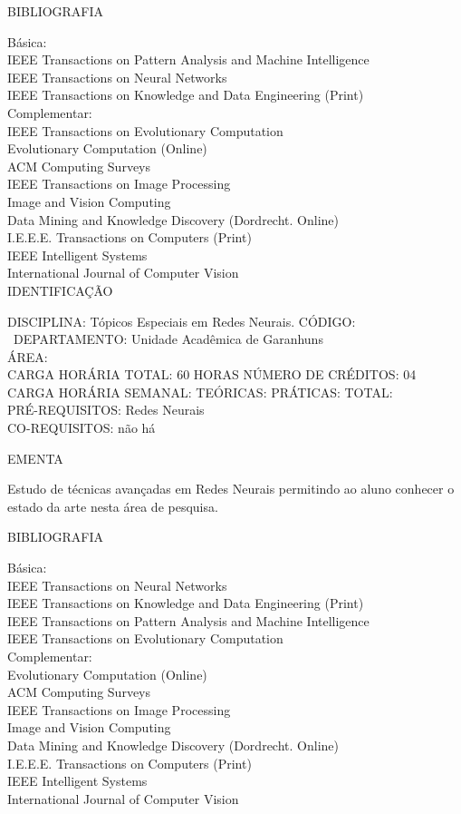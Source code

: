 \documentclass[
	12pt,				%
	openright,			%
  oneside,     %
	a4paper,			%
	chapter=TITLE,		%
	english,			%
	french,				%
	spanish,			%
	brazil				%
	]{abntex2}
\begin{document}
\begin{apendicesenv}
BIBLIOGRAFIA 

Básica:\\
IEEE Transactions on Pattern Analysis and Machine Intelligence\\
IEEE Transactions on Neural Networks\\
IEEE Transactions on Knowledge and Data Engineering (Print)\\
Complementar:\\
IEEE Transactions on Evolutionary Computation\\
Evolutionary Computation (Online)\\
ACM Computing Surveys\\
IEEE Transactions on Image Processing\\
Image and Vision Computing\\
Data Mining and Knowledge Discovery (Dordrecht. Online)\\
I.E.E.E. Transactions on Computers (Print)\\
IEEE Intelligent Systems\\
International Journal of Computer Vision\\

\newpage IDENTIFICAÇÃO

DISCIPLINA: Tópicos Especiais em Redes Neurais. CÓDIGO:\\\
DEPARTAMENTO: Unidade Acadêmica de Garanhuns\\ ÁREA: \\
CARGA HORÁRIA TOTAL: 60 HORAS NÚMERO DE CRÉDITOS: 04\\
CARGA HORÁRIA SEMANAL: TEÓRICAS: PRÁTICAS: TOTAL: \\
PRÉ-REQUISITOS: Redes Neurais\\
CO-REQUISITOS: não há

EMENTA 

Estudo de técnicas avançadas em Redes Neurais permitindo ao aluno
conhecer o estado da arte nesta área de pesquisa.

BIBLIOGRAFIA 

Básica:\\
IEEE Transactions on Neural Networks\\
IEEE Transactions on Knowledge and Data Engineering (Print)\\
IEEE Transactions on Pattern Analysis and Machine Intelligence\\
IEEE Transactions on Evolutionary Computation\\
Complementar:\\
Evolutionary Computation (Online)\\
ACM Computing Surveys\\
IEEE Transactions on Image Processing\\
Image and Vision Computing\\
Data Mining and Knowledge Discovery (Dordrecht. Online)\\
I.E.E.E. Transactions on Computers (Print)\\
IEEE Intelligent Systems\\
International Journal of Computer Vision\\


\end{apendicesenv}
\end{document}
